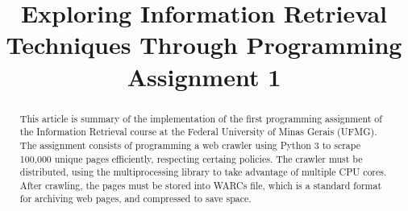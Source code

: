
\title[Exploring IR Techniques Through PA 1]{Exploring Information Retrieval Techniques Through Programming Assignment 1} %

\begin{abstract}
  This article is summary of the implementation of the first programming assignment of the Information Retrieval course at the Federal University of Minas Gerais (UFMG). The assignment consists of programming a web crawler using Python 3 to scrape 100,000 unique pages efficiently, respecting certaing policies. The crawler must be distributed, using the multiprocessing library to take advantage of multiple CPU cores. After crawling, the pages must be stored into WARCs file, which is a standard format for archiving web pages, and compressed to save space.
\end{abstract}




\maketitle

